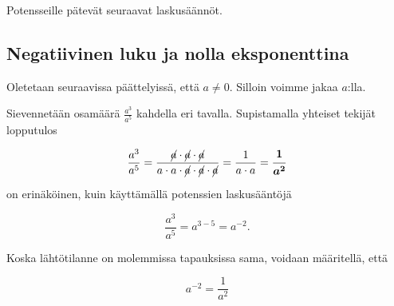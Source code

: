     Potensseille pätevät seuraavat laskusäännöt.
    
    
\subsection*{Negatiivinen luku ja nolla eksponenttina}

Oletetaan seuraavissa päättelyissä, että $a \neq 0$. Silloin voimme jakaa $a$:lla.
    
    Sievennetään osamäärä $\frac{a^3}{a^5}$ kahdella eri tavalla. Supistamalla yhteiset tekijät lopputulos
    
    \begin{equation*}
        \frac{a^3}{a^5} =
        \frac{\cancel{a}\cdot \cancel{a}\cdot \cancel{a}}{a\cdot a\cdot
        \cancel{a}\cdot \cancel{a}\cdot \cancel{a}} = 
        \frac{1}{a\cdot a}=\boldsymbol{\frac{1}{a^2}}
    \end{equation*}
    
    on erinäköinen, kuin käyttämällä potenssien laskusääntöjä
    
    \begin{equation*}
        \frac{a^3}{a^5} = a^{3-5}= a^{-2}{.}
    \end{equation*}
    
    Koska lähtötilanne on molemmissa tapauksissa sama, voidaan määritellä, että
    
    \begin{equation*}
        a^{-2} = \frac{1}{a^2}
    \end{equation*}
  
